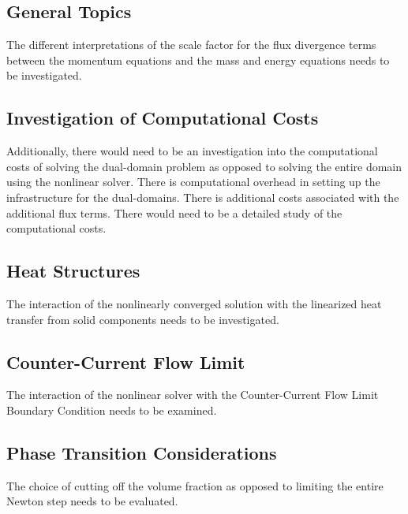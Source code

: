 \subsection{General Topics}
\label{sect:futureWorkGeneralTopics}
The different interpretations of the scale factor for the flux divergence terms between the momentum equations and the mass and energy equations needs to be investigated.

\subsection{Investigation of Computational Costs}
\label{sect:futureWorkComputationalCosts}
Additionally, there would need to be an investigation into the computational costs of solving the dual-domain problem as opposed to solving the entire domain using the nonlinear solver.
There is computational overhead in setting up the infrastructure for the dual-domains.
There is additional costs associated with the additional flux terms.
There would need to be a detailed study of the computational costs.

\subsection{Heat Structures}
\label{sect:futureWorkHeatStructures}
The interaction of the nonlinearly converged solution with the linearized heat transfer from solid components needs to be investigated.

\subsection{Counter-Current Flow Limit}
\label{sect:futureWorkCCFL}
The interaction of the nonlinear solver with the Counter-Current Flow Limit Boundary Condition needs to be examined.

\subsection{Phase Transition Considerations}
\label{sect:futureWorkPhaseTransition}
The choice of cutting off the volume fraction as opposed to limiting the entire Newton step needs to be evaluated.
